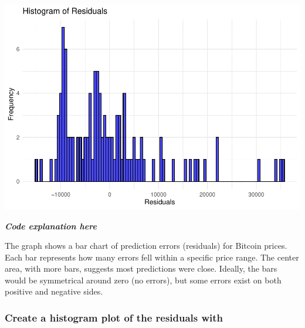 \documentclass[
]{book}
\newenvironment{Shaded}{\begin{snugshade}}{\end{snugshade}}
\newcommand{\AttributeTok}[1]{\textcolor[rgb]{0.13,0.29,0.53}{#1}}
\newcommand{\CommentTok}[1]{\textcolor[rgb]{0.56,0.35,0.01}{\textit{#1}}}
\newcommand{\DecValTok}[1]{\textcolor[rgb]{0.00,0.00,0.81}{#1}}
\newcommand{\FloatTok}[1]{\textcolor[rgb]{0.00,0.00,0.81}{#1}}
\newcommand{\FunctionTok}[1]{\textcolor[rgb]{0.13,0.29,0.53}{\textbf{#1}}}
\newcommand{\NormalTok}[1]{#1}
\newcommand{\SpecialCharTok}[1]{\textcolor[rgb]{0.81,0.36,0.00}{\textbf{#1}}}
\newcommand{\StringTok}[1]{\textcolor[rgb]{0.31,0.60,0.02}{#1}}
\begin{document}
\includegraphics{bookdown-demo_files/figure-latex/unnamed-chunk-23-1.pdf}

\emph{\textbf{Code explanation here}}

The graph shows a bar chart of prediction errors (residuals) for Bitcoin prices. Each bar represents how many errors fell within a specific price range. The center area, with more bars, suggests most predictions were close. Ideally, the bars would be symmetrical around zero (no errors), but some errors exist on both positive and negative sides.

\subsubsection{Create a histogram plot of the residuals with}\label{create-a-histogram-plot-of-the-residuals-with}

\begin{Shaded}
\end{Shaded}
\end{document}
